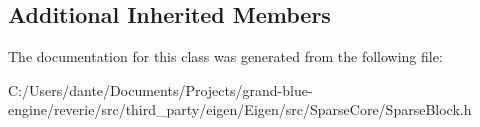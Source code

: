\subsection*{Additional Inherited Members}


The documentation for this class was generated from the following file\+:\begin{DoxyCompactItemize}
\item 
C\+:/\+Users/dante/\+Documents/\+Projects/grand-\/blue-\/engine/reverie/src/third\+\_\+party/eigen/\+Eigen/src/\+Sparse\+Core/Sparse\+Block.\+h\end{DoxyCompactItemize}
